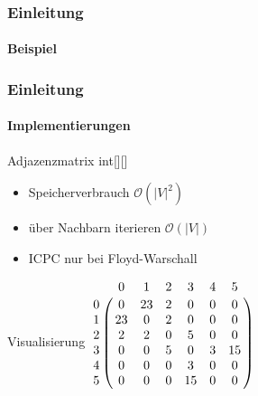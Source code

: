 \begin{frame}
    \frametitle{Einleitung}
    \framesubtitle{Beispiel}
\end{frame}

\begin{frame}
    \frametitle{Einleitung}
    \framesubtitle{Implementierungen}
    \begin{KITexampleblock}{Adjazenzmatrix}
    int[][]
    \begin{itemize}
        \item Speicherverbrauch \( \mathcal{O}(|V|^2)\)
        \item über Nachbarn iterieren \( \mathcal{O}(|V|)\)
        \item ICPC nur bei Floyd-Warschall
    \end{itemize}
    \end{KITexampleblock}
    \vspace{0.001em}
    \begin{KITinfoblock}{Visualisierung}
        $\bordermatrix{
  & 0  & 1  & 2  & 3  & 4  & 5  \cr
0 & 0  & 23 & 2  & 0  & 0  & 0  \cr
1 & 23 & 0  & 2  & 0  & 0  & 0  \cr
2 & 2  & 2  & 0  & 5  & 0  & 0  \cr
3 & 0  & 0  & 5  & 0  & 3  & 15 \cr
4 & 0  & 0  & 0  & 3  & 0  & 0  \cr
5 & 0  & 0  & 0  & 15 & 0  & 0  \cr
} $ %
    \end{KITinfoblock}
\end{frame}

